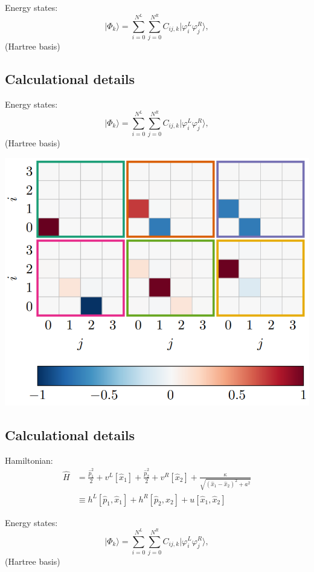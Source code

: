 \documentclass[%
oneside,                 %
final,                   %
10pt]{article}
\begin{document}
Energy states:
\begin{equation}
\vert\Phi_k\rangle = \sum_{i = 0}^{N^L} \sum_{j = 0}^{N^R} C_{ij, k}\vert \varphi^L_i \varphi^R_j\rangle,
\end{equation}
(Hartree basis)

\subsection{Calculational details}

Energy states:
\begin{equation}
\vert\Phi_k\rangle = \sum_{i = 0}^{N^L} \sum_{j = 0}^{N^R} C_{ij, k}\vert \varphi^L_i \varphi^R_j\rangle,
\end{equation}
(Hartree basis)

\vspace{6mm}

\centerline{\includegraphics[width=0.7\linewidth]{qcfigures/Hartree_coefs.png}}

\vspace{6mm}

\subsection{Calculational details}

Hamiltonian:
\begin{align}
\hat{H} &= \frac{\hat{p}_1^2}{2} + v^L[\hat{x}_1] + \frac{\hat{p}_2^2}{2} + v^R[\hat{x}_2] + \frac{\kappa}{\sqrt{(\hat{x}_1-\hat{x}_2)^2 + a^2}} \\
&\equiv h^L[\hat{p}_1,\hat{x}_1] + h^R[\hat{p}_2,\hat{x}_2] + u[\hat{x}_1,\hat{x}_2]
\end{align}

Energy states:
\begin{equation}
\vert\Phi_k\rangle = \sum_{i = 0}^{N^L} \sum_{j = 0}^{N^R} C_{ij, k}\vert \varphi^L_i \varphi^R_j\rangle,
\end{equation}
(Hartree basis)
\end{document}
